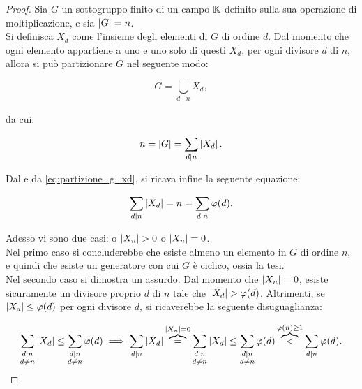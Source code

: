 \documentclass[11pt]{scrbook}
\begin{document}
\begin{proof}
    Sia $G$ un sottogruppo finito di un campo $\mathbb{K}$ definito
    sulla sua operazione di moltiplicazione, e sia
    $\left|G\right| = n$. \\

    Si definisca $X_d$ come l'insieme degli elementi di $G$
    di ordine $d$. Dal momento che ogni elemento appartiene
    a uno e uno solo di questi $X_d$, per ogni divisore
    $d$ di $n$, allora si può partizionare $G$ nel
    seguente modo:

    \begin{equation*}
        G = \bigcup_{d \mid n} X_d,
    \end{equation*}

    da cui:

    \begin{equation}
        \label{eq:partizione_g_xd}
        n = \left|G\right| = \sum_{d \mid n} \left|X_d\right|.
    \end{equation}

    \vskip 0.1in

    Dal  e da \eqref{eq:partizione_g_xd},
    si ricava infine la seguente equazione:

    \begin{equation}
        \label{eq:uguaglianza_xd}
        \sum_{d \mid n} \left|X_d\right| = n = \sum_{d \mid n} \varphi(d).
    \end{equation}

    Adesso vi sono due casi: o $\left|X_n\right| > 0$ o $\left|X_n\right| = 0$. \\

    Nel primo caso si concluderebbe che esiste almeno un elemento in
    $G$ di ordine $n$, e quindi che esiste un generatore con cui
    $G$ è ciclico, ossia la tesi. \\

    Nel secondo caso si dimostra un assurdo. Dal momento che
    $\left|X_n\right| = 0$, esiste sicuramente un divisore proprio
    $d$ di $n$ tale che $\left|X_d\right| > \varphi(d)$. Altrimenti,
    se $\left|X_d\right| \leq \varphi(d)$ per ogni divisore $d$,
    si ricaverebbe la seguente disuguaglianza:

    \[ \sum_{\substack{d \mid n \\ d \neq n}} \left|X_d\right| \leq \sum_{
            \substack{d \mid n \\ d \neq n}} \varphi(d) \implies \sum_{d \mid n} \left|X_d\right|
        \overbrace{=}^{\left|X_n\right|=0} \sum_{\substack{d \mid n \\ d \neq n}} \left|X_d\right|
        \leq \sum_{\substack{d \mid n \\ d \neq n}} \varphi(d)
        \overbrace{<}^{\varphi(n) \geq 1} \sum_{d \mid n} \varphi(d).\]


\end{proof}
\end{document}
